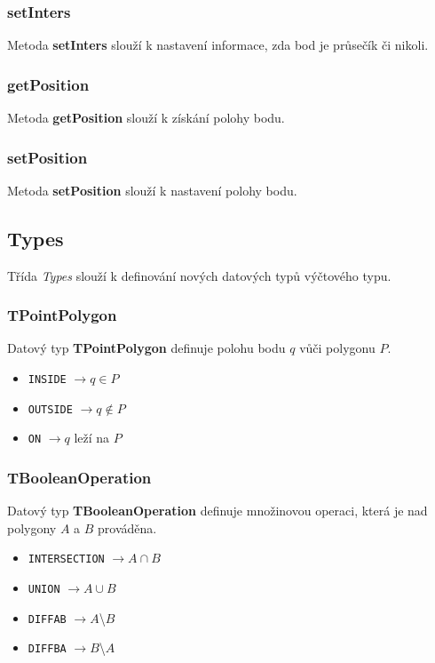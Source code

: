 \documentclass[a4paper, 12pt]{article}
\begin{document}
\subsubsection*{setInters}
Metoda \textbf{setInters} slouží k nastavení informace, zda bod je průsečík či nikoli. 

\subsubsection*{getPosition}
Metoda \textbf{getPosition} slouží k získání polohy bodu.

\subsubsection*{setPosition}
Metoda \textbf{setPosition} slouží k nastavení polohy bodu. 


\subsection{Types}
Třída \textit{Types} slouží k definování nových datových typů výčtového typu.

\subsubsection*{TPointPolygon}
Datový typ \textbf{TPointPolygon} definuje polohu bodu $q$ vůči polygonu $P$.\\ 
\begin{itemize}
\item \texttt{INSIDE} $\rightarrow q \in P$
\item \texttt{OUTSIDE} $\rightarrow q \notin P$
\item \texttt{ON} $\rightarrow q$ leží na $P$
\end{itemize}

\subsubsection*{TBooleanOperation}
Datový typ \textbf{TBooleanOperation} definuje množinovou operaci, která je nad polygony $A$ a $B$ prováděna.\\ 
\begin{itemize}
\item \texttt{INTERSECTION} $\rightarrow A \cap B$ 
\item \texttt{UNION} $\rightarrow A \cup B$
\item \texttt{DIFFAB} $\rightarrow A$\textbackslash $B$
\item \texttt{DIFFBA} $\rightarrow B$\textbackslash $A$
\end{itemize}
\end{document}
